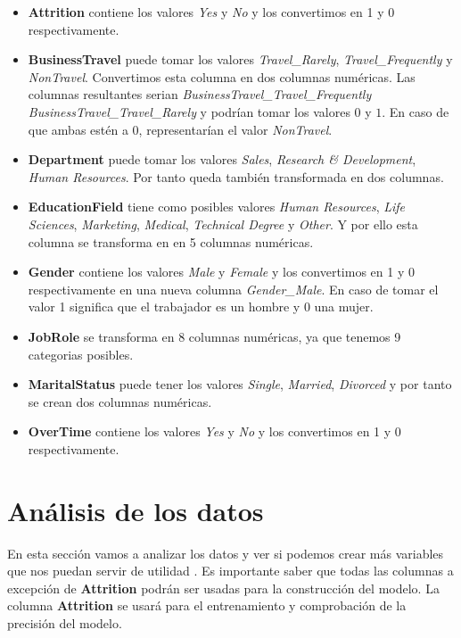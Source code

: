 \begin{itemize}
	\item \textbf{Attrition} contiene los valores \textit{Yes} y \textit{No} y los convertimos en 1 y 0 respectivamente.
	\item \textbf{BusinessTravel} puede tomar los valores \textit{Travel\_Rarely}, \textit{Travel\_Frequently} y \textit{Non\-Travel}. 
	Convertimos esta columna en dos columnas numéricas.
	Las columnas resultantes serian \textit{BusinessTravel\_Travel\_Frequently} \textit{BusinessTravel\_Travel\_Rarely} y podrían tomar los valores $0$ y $1$.
	En caso de que ambas estén a $0$, representarían el valor \textit{Non\-Travel}.
	\item \textbf{Department} puede tomar los valores \textit{Sales}, \textit{Research \& Development}, \textit{Human Resources}. 
	Por tanto queda también transformada en dos columnas.
	\item \textbf{EducationField} tiene como posibles valores \textit{Human Resources}, \textit{Life Sciences}, \textit{Marketing}, \textit{Medical}, \textit{Technical Degree} y \textit{Other}. 
	Y por ello esta columna se transforma en en 5 columnas numéricas. 
	\item \textbf{Gender} contiene los valores \textit{Male} y \textit{Female} y los convertimos en 1 y 0 respectivamente en una nueva columna \textit{Gender\_Male}.
	En caso de tomar el valor 1 significa que el trabajador es un hombre y 0 una mujer.
	\item \textbf{JobRole} se transforma en 8 columnas numéricas, ya que tenemos 9 categorias posibles.
	\item \textbf{MaritalStatus} puede tener los valores \textit{Single}, \textit{Married}, \textit{Divorced} y por tanto se crean dos columnas numéricas.
	\item \textbf{OverTime} contiene los valores \textit{Yes} y \textit{No} y los convertimos en 1 y 0 respectivamente.
\end{itemize}

\section{Análisis de los datos}
En esta sección vamos a analizar los datos y ver si podemos crear más variables que nos puedan servir de utilidad  \cite{bowles_2015}.
Es importante saber que todas las columnas a excepción de \textbf{Attrition} podrán ser usadas para la construcción del modelo. 
La columna \textbf{Attrition} se usará para el entrenamiento y comprobación de la precisión del modelo.\\

